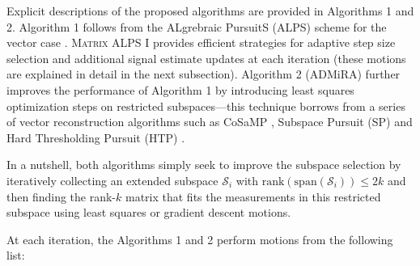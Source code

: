 \documentclass[twocolumn]{svjour3}
\newcommand{\rank}{k}
\begin{document}
Explicit descriptions of the proposed algorithms are provided in Algorithms 1 and 2. Algorithm 1 follows from the ALgrebraic PursuitS (ALPS) scheme for the vector case \cite{cevher2011alps}. \textsc{Matrix ALPS I} provides efficient strategies for adaptive step size selection and additional signal estimate updates at each iteration (these motions are explained in detail in the next subsection). Algorithm 2 (ADMiRA) \cite{admira2010} further improves the performance of Algorithm 1 by introducing least squares optimization steps on restricted subspaces---this technique borrows from a series of vector reconstruction algorithms such as CoSaMP \cite{cosamp}, Subspace Pursuit (SP) \cite{SP} and Hard Thresholding Pursuit (HTP) \cite{HTP}. 

In a nutshell, both algorithms simply seek to improve the subspace selection by iteratively collecting an extended subspace $ \mathcal{S}_i $ with $ \text{rank}(\text{span}(\mathcal{S}_i)) \leq 2\rank $ and then finding the rank-$ \rank $ matrix that fits the measurements in this restricted subspace using least squares or gradient descent motions. 

At each iteration, the Algorithms 1 and 2 perform motions from the following list:
\end{document}
